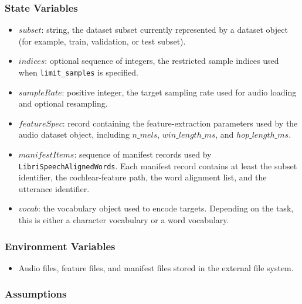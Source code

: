\documentclass[12pt, titlepage]{article}
\begin{document}
\subsubsection{State Variables}

\begin{itemize}
\item $subset$: string, the dataset subset currently represented by a dataset object (for example, train, validation, or test subset).

\item $indices$: optional sequence of integers, the restricted sample indices used when \texttt{limit\_samples} is specified.

\item $sampleRate$: positive integer, the target sampling rate used for audio loading and optional resampling.

\item $featureSpec$: record containing the feature-extraction parameters used by the audio dataset object, including $n\_mels$, $win\_length\_ms$, and $hop\_length\_ms$.

\item $manifestItems$: sequence of manifest records used by
\texttt{LibriSpeechAlignedWords}. Each manifest record contains at least the subset identifier, the cochlear-feature path, the word alignment list, and the utterance identifier.

\item $vocab$: the vocabulary object used to encode targets. Depending on the task, this is either a character vocabulary or a word vocabulary.
\end{itemize}

\subsubsection{Environment Variables}

\begin{itemize}
    \item Audio files, feature files, and manifest files stored in the external file system.
\end{itemize}

\subsubsection{Assumptions}
\end{document}
